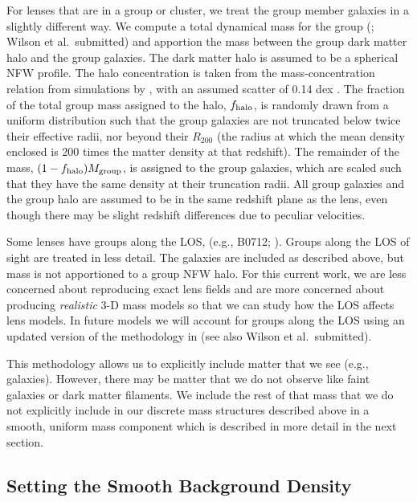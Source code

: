 \documentclass{emulateapj}
\begin{document}
For lenses that are in a group or cluster, we treat the group member galaxies in a slightly different way. We compute a total dynamical mass for the group (\citealt{Girardi98,Momcheva06,Ammons14,Momcheva15}; Wilson et al.\ submitted) and apportion the mass between the group dark matter halo and the group galaxies. The dark matter halo is assumed to be a spherical NFW profile. The halo concentration is taken from the mass-concentration relation from simulations by \citet{Zhao09}, with an assumed scatter of 0.14 dex \citep{Bullock01}. The fraction of the total group mass assigned to the halo, $f_{\rm{halo}}$, is randomly drawn from a uniform distribution such that the group galaxies are not truncated below twice their effective radii, nor beyond their $R_{200}$ (the radius at which the mean density enclosed is 200 times the matter density at that redshift). The remainder of the mass, $(1-f_{\rm{halo}})M_{\rm{group}}$, is assigned to the group galaxies, which are scaled such that they have the same density at their truncation radii. All group galaxies and the group halo are assumed to be in the same redshift plane as the lens, even though there may be slight redshift differences due to peculiar velocities. 

Some lenses have groups along the LOS, (e.g., B0712; \citealt{Fassnacht02}). Groups along the LOS of sight are treated in less detail. The galaxies are included as described above, but mass is not apportioned to a group NFW halo. For this current work, we are less concerned about reproducing exact lens fields and are more concerned about producing \textit{realistic} 3-D mass models so that we can study how the LOS affects lens models. In future models we will account for groups along the LOS using an updated version of the methodology in \citet{Ammons14} (see also Wilson et al.\ submitted). 

This methodology allows us to explicitly include matter that we see (e.g., galaxies). However, there may be matter that we do not observe like faint galaxies or dark matter filaments. We include the rest of that mass that we do not explicitly include in our discrete mass structures described above in a smooth, uniform mass component which is described in more detail in the next section.

\subsection{Setting the Smooth Background Density}
\label{sec:voids}
\end{document}
